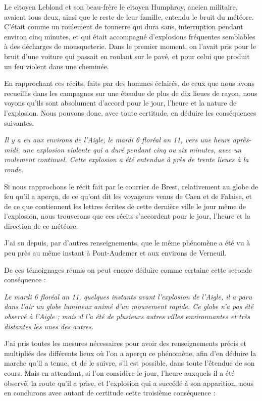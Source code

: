 \documentclass[a4paper, 11pt, oneside, polutonikogreek, french]{article}
\begin{document}
Le citoyen Leblond et son beau-frère le citoyen Humphroy, ancien militaire, avaient tous deux, ainsi que le reste de leur famille, entendu le bruit du météore. C'était comme un roulement de tonnerre qui dura sans, interruption pendant environ cinq minutes, et qui était accompagné d'explosions fréquentes semblables à des décharges de mousqueterie. Dans le premier moment, on l'avait pris pour le bruit d'une voiture qui passait en roulant sur le pavé, et pour celui que produit un feu violent dans une cheminée.

En rapprochant ces récits, faits par des hommes éclairés, de ceux que nous avons recueillis dans les campagnes sur une étendue de plus de dix lieues de rayon, nous voyons qu'ils sont absolument d'accord pour le jour, l'heure et la nature de l'explosion. Nous pouvons donc, avec toute certitude, en déduire les conséquences suivantes.

\emph{Il y a eu aux environs de l'Aigle, le mardi 6 floréal an 11, vers une heure après-midi, une explosion violente qui a duré pendant cinq ou six minutes, avec un roulement continuel. Cette explosion a été entendue à près de trente lieues à la ronde.}

Si nous rapprochons le récit fait par le courrier de Brest, relativement au globe de feu qu'il a aperçu, de ce qu'ont dit les voyageurs venus de Caen et de Falaise, et de ce que contiennent les lettres écrites de cette dernière ville le jour même de l'explosion, nous trouverons que ces récits s'accordent pour le jour, l'heure et la direction de ce météore.

J'ai su depuis, par d'autres renseignements, que le même phénomène a été vu à peu près au même instant à Pont-Audemer et aux environs de Verneuil.

De ces témoignages réunis on peut encore déduire comme certaine cette seconde conséquence :

\emph{Le mardi 6 floréal an 11, quelques instants avant l'explosion de l'Aigle, il a paru dans l'air un globe lumineux animé d'un mouvement rapide. Ce globe n'a pas été observé à l'Aigle ; mais il l'a été de plusieurs autres villes environnantes et très distantes les unes des autres.}

J'ai pris toutes les mesures nécessaires pour avoir des renseignements précis et multipliés des différents lieux où l'on a aperçu ce phénomène, afin d'en déduire la marche qu'il a tenue, et de le suivre, s'il est possible, dans toute l'étendue de son cours. Mais en attendant, si l'on considère le jour, l'heure auxquels il a été observé, la route qu'il a prise, et l'explosion qui a succédé à son apparition, nous en conclurons avec autant de certitude cette troisième conséquence :
\end{document}
